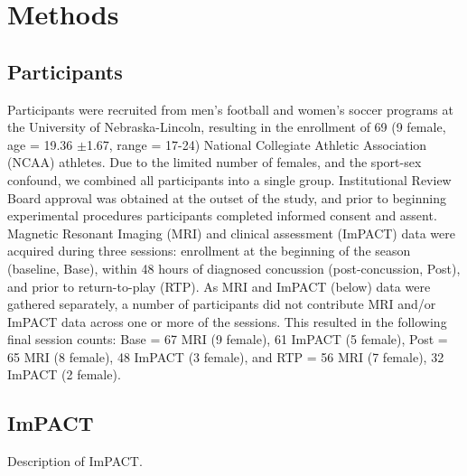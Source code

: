 \documentclass[12pt]{article}
\begin{document}


\section{Methods}
\label{sec:meth}

\subsection{Participants}
\label{ssec:meth-part}
Participants were recruited from men's football and women's soccer programs at the University of Nebraska-Lincoln, resulting in the enrollment of 69 (9 female, age = 19.36 $\pm$1.67, range = 17-24) National Collegiate Athletic Association (NCAA) athletes. Due to the limited number of females, and the sport-sex confound, we combined all participants into a single group. Institutional Review Board approval was obtained at the outset of the study, and prior to beginning experimental procedures participants completed informed consent and assent. Magnetic Resonant Imaging (MRI) and clinical assessment (ImPACT) data were acquired during three sessions: enrollment at the beginning of the season (baseline, Base), within 48 hours of diagnosed concussion (post-concussion, Post), and prior to return-to-play (RTP). As MRI and ImPACT (below) data were gathered separately, a number of participants did not contribute MRI and/or ImPACT data across one or more of the sessions. This resulted in the following final session counts: Base = 67 MRI (9 female), 61 ImPACT (5 female), Post = 65 MRI (8 female), 48 ImPACT (3 female), and RTP = 56 MRI (7 female), 32 ImPACT (2 female).


\subsection{ImPACT}
\label{ssec:meth-imp}
Description of ImPACT.

\end{document}
